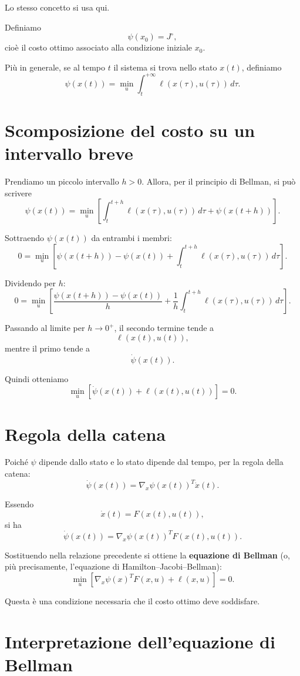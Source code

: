 Lo stesso concetto si usa qui.

Definiamo
\[
\psi(x_0)=J^\circ,
\]
cioè il costo ottimo associato alla condizione iniziale \(x_0\).

Più in generale, se al tempo \(t\) il sistema si trova nello stato \(x(t)\),
definiamo
\[
\psi(x(t))
=
\min_u \int_t^{+\infty}\ell(x(\tau),u(\tau))\,d\tau.
\]

\section{Scomposizione del costo su un intervallo breve}

Prendiamo un piccolo intervallo \(h>0\). Allora, per il principio di Bellman,
si può scrivere
\[
\psi(x(t))
=
\min_u
\left[
\int_t^{t+h}\ell(x(\tau),u(\tau))\,d\tau
+
\psi(x(t+h))
\right].
\]

Sottraendo \(\psi(x(t))\) da entrambi i membri:
\[
0
=
\min_u
\left[
\psi(x(t+h))-\psi(x(t))
+
\int_t^{t+h}\ell(x(\tau),u(\tau))\,d\tau
\right].
\]

Dividendo per \(h\):
\[
0
=
\min_u
\left[
\frac{\psi(x(t+h))-\psi(x(t))}{h}
+
\frac{1}{h}\int_t^{t+h}\ell(x(\tau),u(\tau))\,d\tau
\right].
\]

Passando al limite per \(h\to 0^+\), il secondo termine tende a
\[
\ell(x(t),u(t)),
\]
mentre il primo tende a
\[
\dot\psi(x(t)).
\]

Quindi otteniamo
\[
\min_u\left[\dot\psi(x(t))+\ell(x(t),u(t))\right]=0.
\]

\section{Regola della catena}

Poiché \(\psi\) dipende dallo stato e lo stato dipende dal tempo,
per la regola della catena:
\[
\dot\psi(x(t))
=
\nabla_x\psi(x(t))^T \dot x(t).
\]

Essendo
\[
\dot x(t)=F(x(t),u(t)),
\]
si ha
\[
\dot\psi(x(t))
=
\nabla_x\psi(x(t))^T F(x(t),u(t)).
\]

Sostituendo nella relazione precedente si ottiene la
\textbf{equazione di Bellman} (o, più precisamente, l'equazione di Hamilton--Jacobi--Bellman):
\[
\min_u
\left[
\nabla_x\psi(x)^T F(x,u)+\ell(x,u)
\right]
=0.
\]

Questa è una condizione necessaria che il costo ottimo deve soddisfare.

\section{Interpretazione dell'equazione di Bellman}

